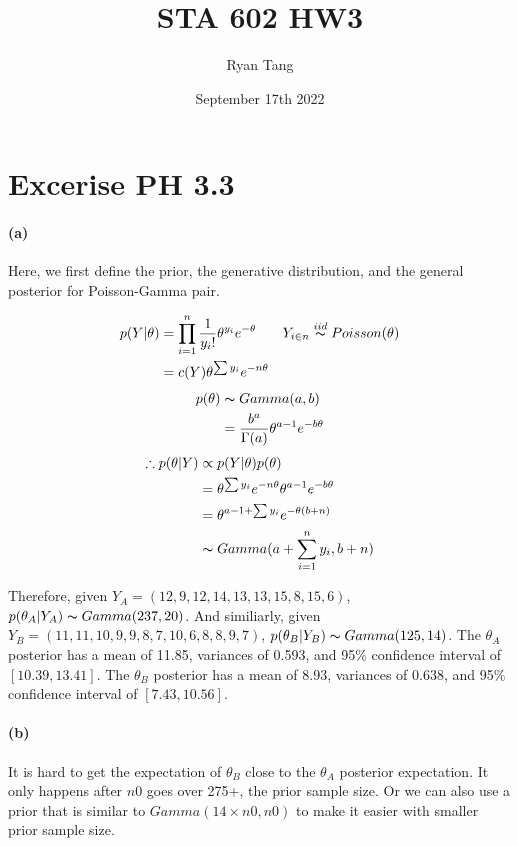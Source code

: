 \documentclass[11pt, letterpaper]{article}
\title{STA 602 HW3}
\author{Ryan Tang}
\date{September 17th 2022}
\begin{document}
\maketitle

\section{Excerise PH 3.3}
\paragraph{(a)}
Here, we first define the prior, the generative distribution, and the general posterior for Poisson-Gamma pair.

\begin{align*}
  p(Y|\theta) &= \prod_{i=1}^{n} \frac{1}{y_i!} \theta^{y_i} e^{-\theta} && Y_{i \in n} \overset{iid}{\thicksim} Poisson(\theta) \\
    &= c(Y) \theta^{\sum y_i} e^{-n\theta}
\end{align*}
\begin{align*}
  p(\theta) &\thicksim Gamma(a, b) \\
    &= \frac{b^a}{\Gamma(a)} \theta^{a-1} e^{-b\theta}
\end{align*}
\begin{align*}
  \therefore p(\theta|Y) &\propto p(Y|\theta) p(\theta) \\
    &= \theta^{\sum y_i} e^{-n\theta} \theta^{a-1} e^{-b\theta} \\
    &= \theta^{a - 1 + \sum y_i} e^{-\theta(b+n)} \\
    &\thicksim Gamma(a + \sum_{i=1}^{n} y_i, b + n)
\end{align*}

Therefore, given $Y_A = (12, 9, 12, 14, 13, 13, 15, 8, 15, 6)$, $p(\theta_A|Y_A) \thicksim Gamma(237, 20)$.
And similiarly, given $Y_B = (11, 11, 10, 9, 9, 8, 7, 10, 6, 8, 8, 9, 7)$, $p(\theta_B|Y_B) \thicksim Gamma(125, 14)$.
The $\theta_A$ posterior has a mean of 11.85, variances of 0.593, and 95\% confidence interval of $[10.39, 13.41]$.
The $\theta_B$ posterior has a mean of 8.93, variances of 0.638, and 95\% confidence interval of $[7.43, 10.56]$.

\newpage
\paragraph{(b)}
It is hard to get the expectation of $\theta_B$ close to the $\theta_A$ posterior expectation. It only happens
after $n0$ goes over 275+, the prior sample size. Or we can also use a prior that is similar to
$Gamma(14 \times n0, n0)$ to make it easier with smaller prior sample size.
\end{document}
